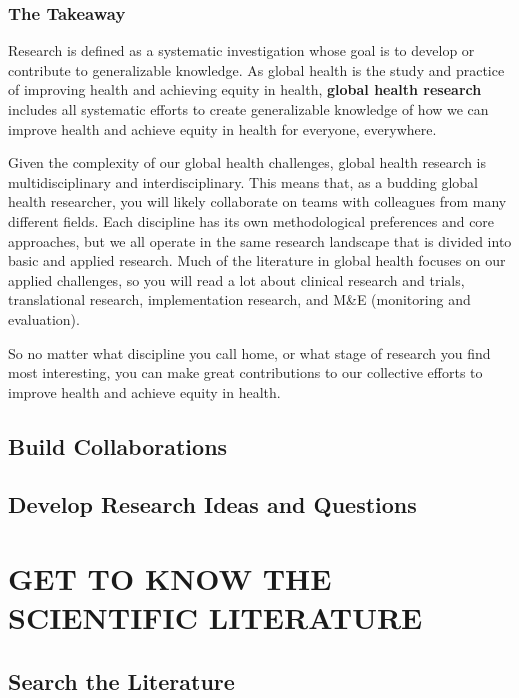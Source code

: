 \documentclass[justified,twoside,symmetric,]{tufte-book}
\begin{document}
\hypertarget{the-takeaway}{%
\section{The Takeaway}\label{the-takeaway}}

Research is defined as a systematic investigation whose goal is to develop or contribute to generalizable knowledge. As global health is the study and practice of improving health and achieving equity in health, \textbf{global health research} includes all systematic efforts to create generalizable knowledge of how we can improve health and achieve equity in health for everyone, everywhere.

Given the complexity of our global health challenges, global health research is multidisciplinary and interdisciplinary. This means that, as a budding global health researcher, you will likely collaborate on teams with colleagues from many different fields. Each discipline has its own methodological preferences and core approaches, but we all operate in the same research landscape that is divided into basic and applied research. Much of the literature in global health focuses on our applied challenges, so you will read a lot about clinical research and trials, translational research, implementation research, and M\&E (monitoring and evaluation).

So no matter what discipline you call home, or what stage of research you find most interesting, you can make great contributions to our collective efforts to improve health and achieve equity in health.

\hypertarget{collaborations}{%
\chapter{Build Collaborations}\label{collaborations}}

\hypertarget{ideas}{%
\chapter{Develop Research Ideas and Questions}\label{ideas}}

\hypertarget{part-get-to-know-the-scientific-literature}{%
\part{GET TO KNOW THE SCIENTIFIC LITERATURE}\label{part-get-to-know-the-scientific-literature}}

\hypertarget{searching}{%
\chapter{Search the Literature}\label{searching}}
\end{document}
